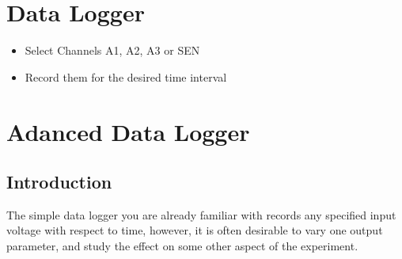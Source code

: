 \documentclass[a4paper,12pt,english]{sphinxmanual}
\begin{document}
\section{Data Logger}
\label{\detokenize{7.2:data-logger}}\label{\detokenize{7.2::doc}}\begin{itemize}
\item {} 
Select Channels A1, A2, A3 or SEN

\item {} 
Record them for the desired time interval

\end{itemize}


\section{Adanced Data Logger}
\label{\detokenize{7.3:adanced-data-logger}}\label{\detokenize{7.3::doc}}

\subsection{Introduction}
\label{\detokenize{7.3:introduction}}
The simple data logger you are already familiar with records any
specified input voltage with respect to time, however, it is often
desirable to vary one output parameter, and study the effect on some
other aspect of the experiment.
\end{document}
